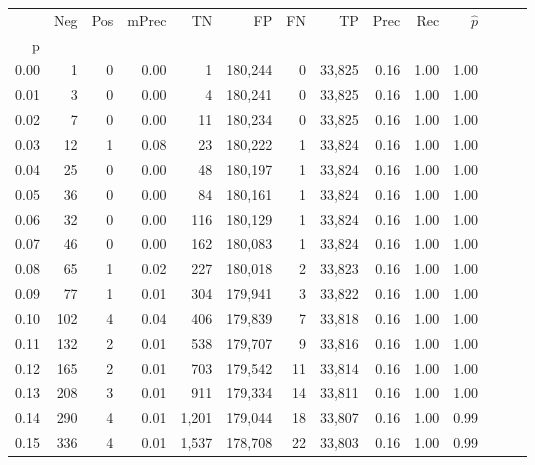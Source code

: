 \begin{tabular}{rrrrrrrrrrrrrr}
\toprule
{} &    Neg &  Pos & mPrec &       TN &       FP &      FN &      TP &  Prec &   Rec & $\hat{p}$ \\
p    &        &      &       &          &          &         &         &       &       &           \\
\midrule
0.00 &      1 &    0 &  0.00 &        1 &  180,244 &       0 &  33,825 &  0.16 &  1.00 &      1.00 \\
0.01 &      3 &    0 &  0.00 &        4 &  180,241 &       0 &  33,825 &  0.16 &  1.00 &      1.00 \\
0.02 &      7 &    0 &  0.00 &       11 &  180,234 &       0 &  33,825 &  0.16 &  1.00 &      1.00 \\
0.03 &     12 &    1 &  0.08 &       23 &  180,222 &       1 &  33,824 &  0.16 &  1.00 &      1.00 \\
0.04 &     25 &    0 &  0.00 &       48 &  180,197 &       1 &  33,824 &  0.16 &  1.00 &      1.00 \\
0.05 &     36 &    0 &  0.00 &       84 &  180,161 &       1 &  33,824 &  0.16 &  1.00 &      1.00 \\
0.06 &     32 &    0 &  0.00 &      116 &  180,129 &       1 &  33,824 &  0.16 &  1.00 &      1.00 \\
0.07 &     46 &    0 &  0.00 &      162 &  180,083 &       1 &  33,824 &  0.16 &  1.00 &      1.00 \\
0.08 &     65 &    1 &  0.02 &      227 &  180,018 &       2 &  33,823 &  0.16 &  1.00 &      1.00 \\
0.09 &     77 &    1 &  0.01 &      304 &  179,941 &       3 &  33,822 &  0.16 &  1.00 &      1.00 \\
0.10 &    102 &    4 &  0.04 &      406 &  179,839 &       7 &  33,818 &  0.16 &  1.00 &      1.00 \\
0.11 &    132 &    2 &  0.01 &      538 &  179,707 &       9 &  33,816 &  0.16 &  1.00 &      1.00 \\
0.12 &    165 &    2 &  0.01 &      703 &  179,542 &      11 &  33,814 &  0.16 &  1.00 &      1.00 \\
0.13 &    208 &    3 &  0.01 &      911 &  179,334 &      14 &  33,811 &  0.16 &  1.00 &      1.00 \\
0.14 &    290 &    4 &  0.01 &    1,201 &  179,044 &      18 &  33,807 &  0.16 &  1.00 &      0.99 \\
0.15 &    336 &    4 &  0.01 &    1,537 &  178,708 &      22 &  33,803 &  0.16 &  1.00 &      0.99 \\

\end{tabular}

